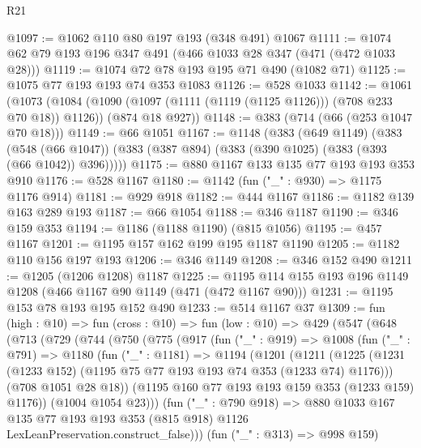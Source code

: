 \begin{lexlean}{R21}
\begin{coremodule}
@1097 := @1062 @110 @80 @197 @193 (@348 @491) @1067
@1111 := @1074 @62 @79 @193 @196 @347 @491 (@466 @1033 @28 @347 (@471 (@472 @1033 @28)))
@1119 := @1074 @72 @78 @193 @195 @71 @490 (@1082 @71)
@1125 := @1075 @77 @193 @193 @74 @353 @1083
@1126 := @528 @1033
@1142 := @1061
    (@1073
      (@1084 (@1090 (@1097 (@1111 (@1119 (@1125 @1126))) (@708 @233 @70 @18)) @1126))
      (@874 @18 @927))
@1148 := @383 (@714 (@66 (@253 @1047 @70 @18)))
@1149 := @66 @1051
@1167 := @1148
    (@383
      (@649 @1149)
      (@383
        (@548 (@66 @1047))
        (@383 (@387 @894) (@383 (@390 @1025) (@383 (@393 (@66 @1042)) @396)))))
@1175 := @880 @1167 @133 @135 @77 @193 @193 @353 @910
@1176 := @528 @1167
@1180 := @1142 (fun ("_" : @930) => @1175 @1176 @914)
@1181 := @929 @918
@1182 := @444 @1167
@1186 := @1182 @139 @163 @289 @193
@1187 := @66 @1054
@1188 := @346 @1187
@1190 := @346 @159 @353
@1194 := @1186 (@1188 @1190) (@815 @1056)
@1195 := @457 @1167
@1201 := @1195 @157 @162 @199 @195 @1187 @1190
@1205 := @1182 @110 @156 @197 @193
@1206 := @346 @1149
@1208 := @346 @152 @490
@1211 := @1205 (@1206 @1208) @1187
@1225 := @1195 @114 @155 @193 @196 @1149 @1208 (@466 @1167 @90 @1149 (@471 (@472 @1167 @90)))
@1231 := @1195 @153 @78 @193 @195 @152 @490
@1233 := @514 @1167 @37
@1309 := fun (high : @10) =>
  fun (cross : @10) =>
  fun (low : @10) =>
  @429
    (@547
      (@648
        (@713
          (@729
            (@744
              (@750
                (@775
                  (@917
                    (fun ("_" : @919) =>
                    @1008
                      (fun ("_" : @791) =>
                      @1180
                        (fun ("_" : @1181) =>
                        @1194
                          (@1201
                            (@1211
                              (@1225
                                (@1231
                                  (@1233 @152)
                                  (@1195 @75 @77 @193 @193 @74 @353 (@1233 @74) @1176)))
                              (@708 @1051 @28 @18))
                            (@1195 @160 @77 @193 @193 @159 @353 (@1233 @159) @1176))
                          (@1004 @1054 @23)))
                      (fun ("_" : @790 @918) =>
                      @880
                        @1033
                        @167
                        @135
                        @77
                        @193
                        @193
                        @353
                        (@815 @918)
                        @1126
                        LexLeanPreservation.construct_false)))
                  (fun ("_" : @313) => @998 @159)

\end{coremodule}
\end{lexlean}
